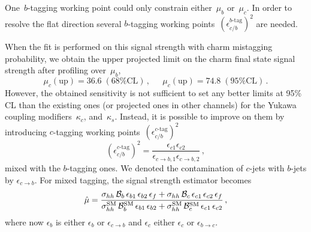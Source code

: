 One~$b$-tagging working point could only constrain either~$ \mu_b$ or~$\mu_c$. In order to resolve the flat direction several $b$-tagging working points~$\left(\epsilon_{c/b}^{\text{$b$-tag}} \right)^2$ are needed. 
\par When the fit is performed on this signal strength with charm mistagging probability, we obtain the upper projected limit on the charm final state signal strength after profiling over~$\mu_b$,
\begin{equation}
	\mu_c(\mathrm{up}) = 36.6 \;(\text{68\% CL})\,, \, \;\;\;\; \,  \mu_c(\mathrm{up}) = 74.8 \;(\text{95\% CL})\,.
\end{equation}
However, the obtained sensitivity is not sufficient to set any better limits at 95\% CL than the existing ones (or projected ones in other  channels) for the Yukawa coupling modifiers~$\kappa_c$, and~$\kappa_s$. Instead, it is possible to  improve on them by introducing $c$-tagging working points~$(\epsilon_{c/b}^{\text{$c$-tag}})^2$
\begin{equation}
	\left( \epsilon_{c/b}^{\text{$c$-tag}}\right)^2 = \frac{\epsilon_{c1}  \epsilon_{c2} }{\epsilon_{c \to b,1} \epsilon_{c \to b,2}}\,,
\end{equation}
mixed with the  $b$-tagging ones. We denoted  the contamination of $c$-jets with $b$-jets by $\epsilon_{c \to b}$.  For mixed tagging,  the signal strength estimator becomes
\begin{equation}
	\hat \mu = \frac{\sigma_{hh}\, \mathcal B_b \,\epsilon_{b1}\,\epsilon_{b2} \, \epsilon_f+\sigma_{hh}\, \mathcal B_c  \,\epsilon_{c1}\,\epsilon_{c2} \,\epsilon_f }{\sigma_{hh}^{\mathrm{SM}}\, \mathcal B_b^{\mathrm{SM}}\, \epsilon_{b1}\,\epsilon_{b2}
		+\sigma_{hh}^{\mathrm{SM}}\, \mathcal B_c^{\mathrm{SM}}\, \epsilon_{c1}\,\epsilon_{c2}
	} \,,
\end{equation}
where now $\epsilon_{b}$ is either $\epsilon_{b}$ or $\epsilon_{c\to b}$  and $\epsilon_{c}$ either $\epsilon_{c}$ or $\epsilon_{b\to c}$.
